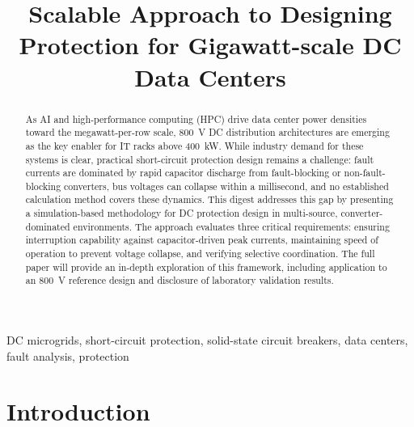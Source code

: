\documentclass[conference]{IEEEtran}
\begin{document}
\title{Scalable Approach to Designing Protection for Gigawatt-scale DC Data Centers}

\author{
}

\maketitle

\begin{abstract}
As AI and high-performance computing (HPC) drive data center power densities toward the megawatt-per-row scale, 800~V DC distribution architectures are emerging as the key enabler for IT racks above 400~kW. While industry demand for these systems is clear, practical short-circuit protection design remains a challenge: fault currents are dominated by rapid capacitor discharge from fault-blocking or non-fault-blocking converters, bus voltages can collapse within a millisecond, and no established calculation method covers these dynamics. This digest addresses this gap by presenting a simulation-based methodology for DC protection design in multi-source, converter-dominated environments. The approach evaluates three critical requirements: ensuring interruption capability against capacitor-driven peak currents, maintaining speed of operation to prevent voltage collapse, and verifying selective coordination. The full paper will provide an in-depth exploration of this framework, including application to an 800~V reference design and disclosure of laboratory validation results.
\end{abstract}

\begin{IEEEkeywords}
DC microgrids, short-circuit protection, solid-state circuit breakers, data centers, fault analysis, protection
\end{IEEEkeywords}

\section{Introduction}
\end{document}
